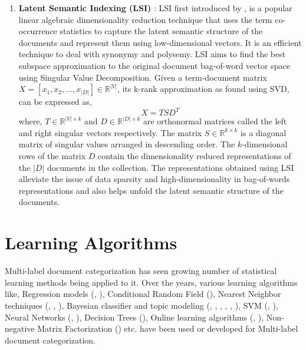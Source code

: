 \begin{enumerate}
\item{\textbf{Latent Semantic Indexing (LSI)} : } LSI first introduced by \cite{deerwester1990indexing}, is a popular linear algebraic dimensionality reduction technique that uses the term co-occurrence statistics to capture the latent semantic structure of the documents and represent them using low-dimensional vectors. It is an efficient technique to deal with synonymy and polysemy. LSI aims to find the best subspace approximation to the original document bag-of-word vector space using Singular Value Decomposition. Given a term-document matrix $X = \left[ x_{1}, x_{2}, \ldots, x_{|D|} \right] \in \mathbb{R}^{|V|}$, its k-rank approximation as found using SVD, can be expressed as, 
\begin{equation}
X = T S D^{T}
\end{equation}
where, $T \in \mathbb{R}^{|V| \times k}$ and $D \in \mathbb{R}^{|D| \times k}$ are orthonormal matrices called the left and right singular vectors respectively. The matrix $S \in \mathbb{R}^{k \times k}$ is a diagonal matrix of singular values arranged in descending order. The $k$-dimensional rows of the matrix $D$ contain the dimensionality reduced representations of the $|D|$ documents in the collection. The representations obtained using LSI alleviate the issue of data sparsity and high-dimensionality in bag-of-words representations and also helps unfold the latent semantic structure of the documents.
\end{enumerate}

\section{Learning Algorithms}
\label{sec:lalgos}
Multi-label document categorization has seen growing number of statistical learning methods being applied to it. Over the years, various learning algorithms like, Regression models (\citep{cooper1994full}, \citep{fuhr1991air}), Conditional Random Field (\citep{ghamrawi2005collective}), Nearest Neighbor techniques (\citep{yang1994expert}, \citep{zhang2005k}, \citep{zhang2007ml}), Bayesian classifier and topic modeling (\citep{lewis1994comparison}, \citep{mccallum1999multi}, \citep{nigam2000text}, \citep{rubin2012statistical}, \citep{nigam1999using}, \citep{ueda2002parametric}), SVM (\citep{joachims1998text}, \citep{elisseeff2001kernel}), Neural Networks (\citep{wiener1995neural}, \citep{ng1997feature}), Decision Trees (\citep{tong1994machine}), Online learning algorithms (\citep{lewis1996training}, \citep{crammer2002new}), Non-negative Matrix Factorization (\citep{liu2006semi}) etc. have been used or developed for Multi-label document categorization.

